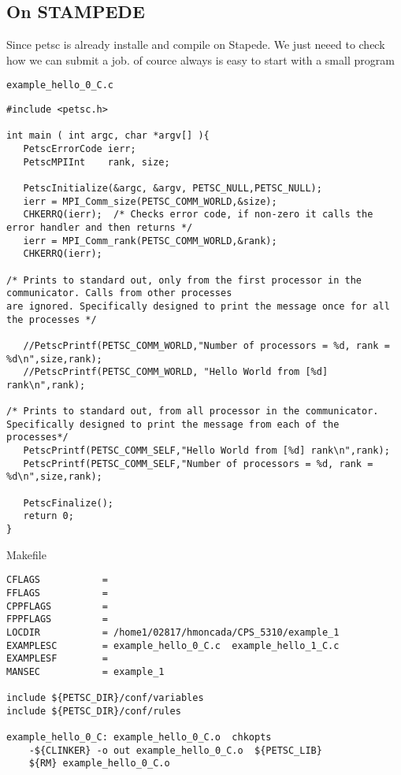 \documentclass{article}
\begin{document}
\subsection{On STAMPEDE}
Since petsc is already installe and compile on Stapede. We just neeed to check how we can submit a job. of cource always is easy to start with a small program 
\begin{description}
\item \verb+example_hello_0_C.c+
\begin{scriptsize}\begin{verbatim}
#include <petsc.h>

int main ( int argc, char *argv[] ){
   PetscErrorCode ierr;
   PetscMPIInt    rank, size;
   
   PetscInitialize(&argc, &argv, PETSC_NULL,PETSC_NULL);
   ierr = MPI_Comm_size(PETSC_COMM_WORLD,&size);
   CHKERRQ(ierr);  /* Checks error code, if non-zero it calls the error handler and then returns */
   ierr = MPI_Comm_rank(PETSC_COMM_WORLD,&rank);
   CHKERRQ(ierr);

/* Prints to standard out, only from the first processor in the communicator. Calls from other processes
are ignored. Specifically designed to print the message once for all the processes */

   //PetscPrintf(PETSC_COMM_WORLD,"Number of processors = %d, rank = %d\n",size,rank);
   //PetscPrintf(PETSC_COMM_WORLD, "Hello World from [%d] rank\n",rank); 

/* Prints to standard out, from all processor in the communicator. Specifically designed to print the message from each of the processes*/ 
   PetscPrintf(PETSC_COMM_SELF,"Hello World from [%d] rank\n",rank);  
   PetscPrintf(PETSC_COMM_SELF,"Number of processors = %d, rank = %d\n",size,rank);

   PetscFinalize();
   return 0;
} 
\end{verbatim}\end{scriptsize}
\item Makefile
\begin{scriptsize}\begin{verbatim}
CFLAGS	         = 
FFLAGS	         = 
CPPFLAGS         = 
FPPFLAGS         =
LOCDIR           = /home1/02817/hmoncada/CPS_5310/example_1
EXAMPLESC        = example_hello_0_C.c  example_hello_1_C.c
EXAMPLESF        =  
MANSEC           = example_1

include ${PETSC_DIR}/conf/variables
include ${PETSC_DIR}/conf/rules

example_hello_0_C: example_hello_0_C.o  chkopts
	-${CLINKER} -o out example_hello_0_C.o  ${PETSC_LIB}
	${RM} example_hello_0_C.o 
	

\end{verbatim}
\end{scriptsize}
\end{description}
\end{document}
